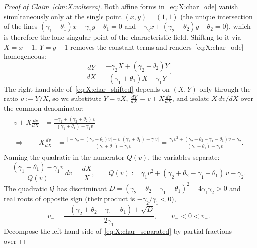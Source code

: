 \begin{proof}[Proof of Claim~\ref{clm:X:volterra}]
Both affine forms in~\eqref{eq:X:char_ode} vanish simultaneously only at the single
point $(x,y)=(1,1)$ (the unique intersection of the lines
$(\gamma_1+\theta_1)x-\gamma_1 y-\theta_1=0$ and
$-\gamma_2 x+(\gamma_2+\theta_2)y-\theta_2=0$), which is therefore the lone singular
point of the characteristic field. Shifting to it via $X=x-1,\ Y=y-1$ removes the
constant terms and renders~\eqref{eq:X:char_ode} homogeneous:
\begin{equation}
    \frac{dY}{dX}
    = \frac{-\gamma_2 X + (\gamma_2+\theta_2)Y}{(\gamma_1+\theta_1)X - \gamma_1 Y}.
    \label{eq:X:char_shifted}
\end{equation}
The right-hand side of~\eqref{eq:X:char_shifted} depends on $(X,Y)$ only through the
ratio $v:=Y/X$, so we substitute $Y=vX$, $\frac{dY}{dX}=v+X\frac{dv}{dX}$, and isolate
$X\,dv/dX$ over the common denominator:
\begin{align}
    \begin{split}
        v + X\frac{dv}{dX}
        &= \frac{-\gamma_2 + (\gamma_2+\theta_2)\,v}{(\gamma_1+\theta_1) - \gamma_1 v}
    \end{split}
    \nonumber\\[2pt]
    \begin{split}
        \Longrightarrow\qquad
        X\frac{dv}{dX}
        &= \frac{\bigl[-\gamma_2+(\gamma_2+\theta_2)v\bigr]
                 - v\bigl[(\gamma_1+\theta_1)-\gamma_1 v\bigr]}
                {(\gamma_1+\theta_1)-\gamma_1 v}
        = \frac{\gamma_1 v^2+(\gamma_2+\theta_2-\gamma_1-\theta_1)v-\gamma_2}
                {(\gamma_1+\theta_1)-\gamma_1 v}.
    \end{split}
    \nonumber
\end{align}
Naming the quadratic in the numerator $Q(v)$, the variables separate:
\begin{equation}
    \frac{(\gamma_1+\theta_1)-\gamma_1 v}{Q(v)}\,dv = \frac{dX}{X},
    \qquad
    Q(v) := \gamma_1 v^2 + (\gamma_2+\theta_2-\gamma_1-\theta_1)\,v - \gamma_2 .
    \label{eq:X:char_separated}
\end{equation}
The quadratic $Q$ has discriminant
$D=(\gamma_2+\theta_2-\gamma_1-\theta_1)^2+4\gamma_1\gamma_2>0$ and real roots of opposite
sign (their product is $-\gamma_2/\gamma_1<0$),
\begin{equation*}
    v_{\pm}=\frac{-(\gamma_2+\theta_2-\gamma_1-\theta_1)\pm\sqrt{D}}{2\gamma_1},
    \qquad v_-<0<v_+ .
\end{equation*}
Decompose the left-hand side of~\eqref{eq:X:char_separated} by partial fractions over

\end{proof}
